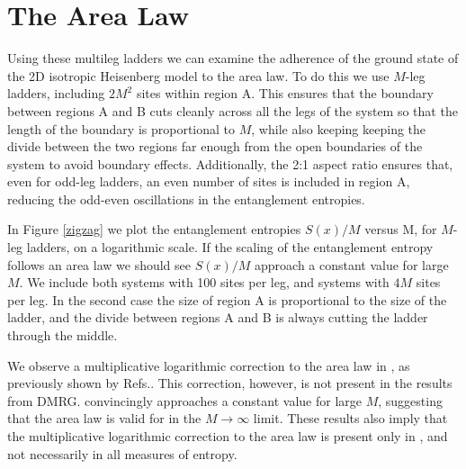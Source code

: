 \section{The Area Law}
\label{vbAlaw}

Using these multileg ladders we can examine the adherence of the ground state of the 2D isotropic Heisenberg model to the area law.
To do this we use $M$-leg ladders, including $2M^2$ sites within region A.  
This ensures that the boundary between regions A and B cuts cleanly across all the legs of the system so that the length of the boundary is proportional to $M$, while also keeping keeping the divide between the two regions far enough from the open boundaries of the system to avoid boundary effects.
Additionally, the 2:1 aspect ratio ensures that, even for odd-leg ladders, an even number of sites is included in region A, reducing the odd-even oscillations in the entanglement entropies.

In Figure \ref{zigzag} we plot the entanglement entropies $S(x)/M$ versus M, for $M$-leg ladders,  on a logarithmic scale.
If the scaling of the entanglement entropy follows an area law we should see $S(x)/M$ approach a constant value for large $M$.
We include both systems with 100 sites per leg, and systems with $4M$ sites per leg. 
In the second case the size of region A is proportional to the size of the ladder, and the divide between regions A and B is always cutting the ladder through the middle.

We observe a multiplicative logarithmic correction to the area law in \vB, as previously shown by Refs.\cite{Alet,Chh}.
This correction, however, is not present in the \vn results from DMRG.
\vn convincingly approaches a constant value for large $M$, suggesting that the area law is valid for \vn in the $M \rightarrow \infty$ limit. 
These results also imply that the multiplicative logarithmic correction to the area law is present only in \vB, and not necessarily in all measures of entropy.

